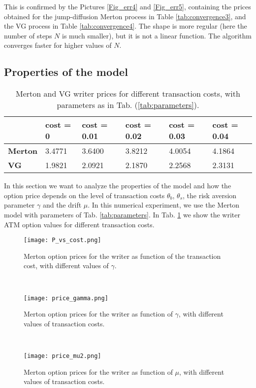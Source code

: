 This is confirmed by the Pictures \ref{Fig_err4} and \ref{Fig_err5}, 
containing the prices obtained for the jump-diffusion Merton process in Table \ref{tab:convergence3}, and the VG process in Table \ref{tab:convergence4}.
The shape is more regular (here the number of steps $N$ is much smaller), but it is not a linear function. 
The algorithm converges faster for higher values of $N$.



\subsection{Properties of the model}\label{properties_model}

\begin{table}[ht]
  \centering
 \begin{tabular}{llllll}
\toprule
 & cost = 0 & cost = 0.01 & cost = 0.02 & cost = 0.03 & cost = 0.04  \\
\midrule
\textbf{Merton} & 3.4771 & 3.6400 & 3.8212 & 4.0054 & 4.1864 \\
\textbf{VG} & 1.9821 & 2.0921 & 2.1870 & 2.2568 & 2.3131 \\
\bottomrule
\end{tabular}
  \caption{Merton and VG writer prices for different transaction costs, with parameters as in Tab. (\ref{tab:parameters}). }
  \label{tab:costs}
\end{table}

In this section we want to analyze the properties of the model and how the option price depends on the level of transaction costs $\theta_b$, $\theta_s$, 
the risk aversion parameter $\gamma$ and the drift $\mu$. 
In this numerical experiment, we use the Merton model with parameters of Tab. \ref{tab:parameters}.
In Tab. \ref{tab:costs} we show the writer ATM option values for different transaction costs.  
\begin{figure}[t!]
 \begin{minipage}[b]{0.5\linewidth}
   \centering
   \texttt{[image: P\_vs\_cost.png]}
   \caption{Merton option prices for the writer as function of the transaction cost, with different values of $\gamma$.}
   \label{Fig10} 
 \end{minipage}
 \ \hspace{2mm} \hspace{3mm} \
 \begin{minipage}[b]{0.5\linewidth}
  \centering
   \texttt{[image: price\_gamma.png]}
   \caption{Merton option prices for the writer as function of $\gamma$, with different values of transaction costs.}
   \label{Fig11}
 \end{minipage}
  \ \hspace{2mm} \hspace{3mm} \
  \begin{minipage}[b]{\linewidth}
  \centering
   \texttt{[image: price\_mu2.png]}
   \caption{Merton option prices for the writer as function of $\mu$, with different values of transaction costs.}
   \label{Fig12}
 \end{minipage}
\end{figure}


